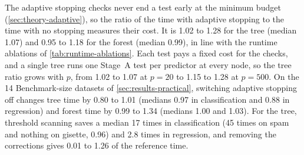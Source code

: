 The adaptive stopping checks never end a test early at the minimum budget
(\cref{sec:theory-adaptive}), so the ratio of the time with adaptive stopping
to the time with no stopping measures their cost. It is 1.02 to 1.28 for the tree (median 1.07) and 0.95 to
1.18 for the forest (median 0.99), in line with the runtime ablations of
\cref{tab:runtime-ablations}. Each test pays a fixed cost for the checks, and a
single tree runs one Stage~A test per predictor at every node, so the tree
ratio grows with $p$, from 1.02 to 1.07 at $p=20$ to 1.15 to 1.28 at $p=500$.
On the 14 Benchmark-size datasets of \cref{sec:results-practical}, switching
adaptive stopping off changes tree time by 0.80 to 1.01 (medians 0.97 in
classification and 0.88 in regression) and forest time by 0.99 to 1.34
(medians 1.00 and 1.03). For the tree, threshold scanning saves a median 17
times in classification (45 times on spam and nothing on gisette, 0.96) and 2.8
times in regression, and removing the corrections
gives 0.01 to 1.26 of the reference time.
